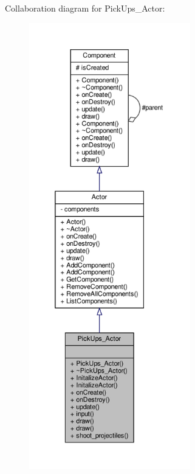 Collaboration diagram for Pick\+Ups\+\_\+\+Actor\+:
\nopagebreak
\begin{figure}[H]
\begin{center}
\leavevmode
\includegraphics[height=550pt]{classPickUps__Actor__coll__graph}
\end{center}
\end{figure}
